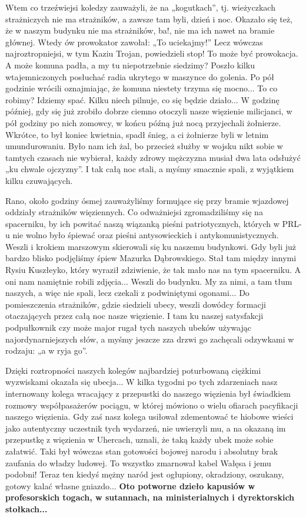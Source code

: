 Wtem co trzeźwiejsi koledzy zauważyli, że na „kogutkach”, tj. wieżyczkach strażniczych nie ma strażników, a zawsze tam byli, dzień i noc. Okazało się też, że w naszym budynku nie ma strażników, ba!, nie ma ich nawet na bramie głównej. Wtedy ów prowokator zawołał: „To uciekajmy!” Lecz wówczas najroztropniejsi, w tym Kaziu Trojan, powiedzieli stop! To może być prowokacja. A może komuna padła, a my tu niepotrzebnie siedzimy? Poszło kilku wtajemniczonych posłuchać radia ukrytego w maszynce do golenia. Po pół godzinie wrócili oznajmiając, że komuna niestety trzyma się mocno... To co robimy? Idziemy spać. Kilku niech pilnuje, co się będzie działo... W godzinę później, gdy się już zrobiło dobrze ciemno otoczyli nasze więzienie milicjanci, w pół godziny po nich zomowcy, w końcu późną już nocą przyjechali żołnierze. Wkrótce, to był koniec kwietnia, spadł śnieg, a ci żołnierze byli w letnim umundurowaniu. Było nam ich żal, bo przecież służby w wojsku nikt sobie w tamtych czasach nie wybierał, każdy zdrowy mężczyzna musiał dwa lata odsłużyć „ku chwale ojczyzny”. I tak całą noc stali, a myśmy smacznie spali, z wyjątkiem kilku czuwających.

Rano, około godziny ósmej zauważyliśmy formujące się przy bramie wjazdowej oddziały strażników więziennych. Co odważniejsi zgromadziliśmy się na spacerniku, by ich powitać naszą wiązanką pieśni patriotycznych, których w PRL-u nie wolno było śpiewać oraz pieśni antysowieckich i antykomunistycznych. Weszli i krokiem marszowym skierowali się ku naszemu budynkowi. Gdy byli już bardzo blisko podjęliśmy śpiew Mazurka Dąbrowskiego. Stał tam między innymi Rysiu Kuszłeyko, który wyraził zdziwienie, że tak mało nas na tym spacerniku. A oni nam namiętnie robili zdjęcia... Weszli do budynku. My za nimi, a tam tłum naszych, a więc nie spali, lecz czekali z podwiniętymi ogonami... Do pomieszczenia strażników, gdzie siedzieli ubecy, weszli dowódcy formacji otaczających przez całą noc nasze więzienie. I tam ku naszej satysfakcji podpułkownik czy może major rugał tych naszych ubeków używając najordynarniejszych słów, a myśmy jeszcze zza drzwi go zachęcali odzywkami w rodzaju: „a w ryja go”. 

Dzięki roztropności naszych kolegów najbardziej poturbowaną ciężkimi wyzwiskami okazała się ubecja... W kilka tygodni po tych zdarzeniach nasz internowany kolega wracający z przepustki do naszego więzienia był świadkiem rozmowy współpasażerów pociągu, w której mówiono o wielu ofiarach pacyfikacji naszego więzienia. Gdy zaś nasz kolega usiłował zdementować te hiobowe wieści jako autentyczny uczestnik tych wydarzeń, nie uwierzyli mu, a na okazaną im przepustkę z więzienia w Uhercach, uznali, że taką każdy ubek może sobie załatwić. Taki był wówczas stan gotowości bojowej narodu i absolutny brak zaufania do władzy ludowej. To wszystko zmarnował kabel Wałęsa i jemu podobni! Teraz ten kiedyś mężny naród jest ogłupiony, okradziony, oszukany, gotowy kalać własne gniazdo... \textbf{Oto potworne dzieło kapusiów w profesorskich togach, w sutannach, na ministerialnych i dyrektorskich stołkach...}

